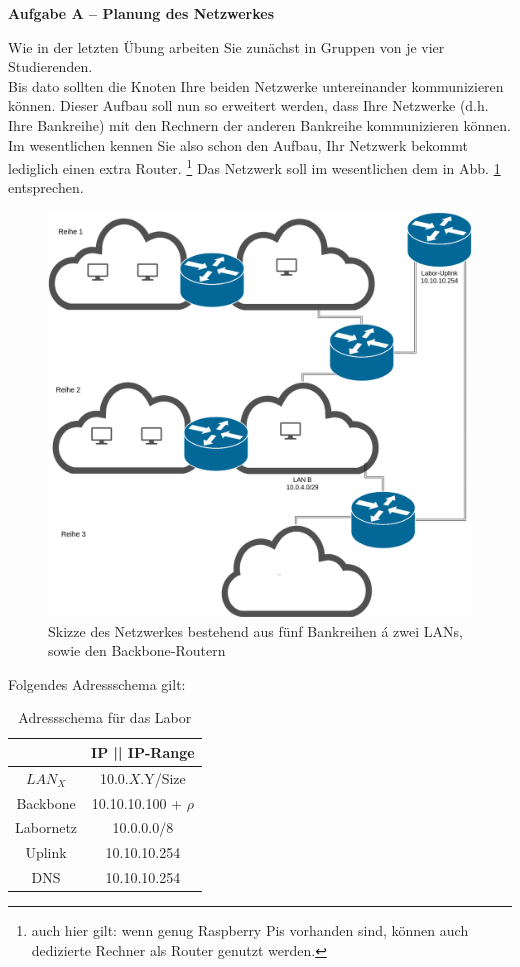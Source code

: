 \documentclass[paper=a4,fontsize=11pt]{scrartcl}%
\numberwithin{equation}{section}
\begin{document}
\begin{center}\Large{\textbf{Aufgabe A -- Planung des Netzwerkes}}\end{center}\vskip0.25in
Wie in der letzten Übung arbeiten Sie zunächst in Gruppen von je vier Studierenden.\\
Bis dato sollten die Knoten Ihre beiden Netzwerke untereinander kommunizieren können. Dieser Aufbau soll nun so erweitert werden, dass Ihre Netzwerke (d.h. Ihre Bankreihe) mit den Rechnern der anderen Bankreihe kommunizieren können. Im wesentlichen kennen Sie also schon den Aufbau, Ihr Netzwerk bekommt lediglich einen extra Router. \footnote{auch hier gilt: wenn genug Raspberry Pis vorhanden sind, können auch dedizierte Rechner als Router genutzt werden.} Das Netzwerk soll im wesentlichen dem in Abb. \ref{backbone} entsprechen.
	\begin{figure}[H]
	\centering
	\includegraphics[scale=0.35]{backbone}
	\caption{Skizze des Netzwerkes bestehend aus fünf Bankreihen á zwei LANs, sowie den Backbone-Routern}
	\label{backbone}
	\end{figure}
Folgendes Adressschema gilt:
\begin{table}[H]
\caption{Adressschema für das Labor}
\label{adress_scheme}
\centering
\begin{tabular}{|c|c|}\hline
 & \textbf{IP  || IP-Range} \\ \hline
 $LAN_X$ & 10.0.$X$.Y/Size \\ \hline
 Backbone & 10.10.10.100 + $\rho$ \\ \hline
 Labornetz & 10.0.0.0/8 \\ \hline
 Uplink & 10.10.10.254 \\ \hline
 DNS & 10.10.10.254 \\ \hline
\end{tabular}
\end{table} 
\end{document}
